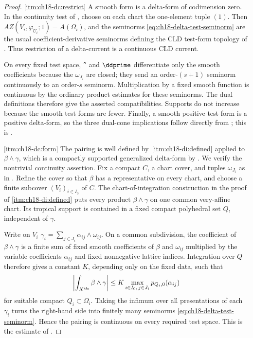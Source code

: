 \begin{proof}
\cref{itm:ch18-dc:restrict} A smooth form is a delta-form of codimension
zero.  In the continuity test of , choose on
each chart the one-element tuple $(1)$.  Then
$AZ(V_i,\varphi_{U_i};1)=A(\Omega_i)$, and the seminorms
\eqref{eq:ch18-delta-test-seminorm} are the usual coefficient-derivative
seminorms defining the CLD test-form topology of
.  Thus restriction of a delta-current is a
continuous CLD current.

On every fixed test space, $\dprime$ and $\ddprime$ differentiate only the
smooth coefficients because the $\omega_{J_i}$ are closed; they send an
order-$(s+1)$ seminorm continuously to an order-$s$ seminorm.
Multiplication by a fixed smooth function is continuous by the ordinary
product estimates for these seminorms.  The dual definitions therefore give
the asserted compatibilities.  Supports do not increase because the smooth
test forms are fewer.  Finally, a smooth positive test form is a positive
delta-form, so the three dual-cone implications follow directly from
; this is \cite[Remark~2.12]{GK19}.

\cref{itm:ch18-dc:form} The pairing is well defined by
\,\cref{itm:ch18-di:defined} applied to
$\beta\wedge\gamma$, which is a compactly supported generalized delta-form
by .  We verify the nontrivial
continuity assertion.  Fix a compact $C$, a chart cover, and tuples
$\omega_{J_i}$ as in .  Refine the cover so
that $\beta$ has a representative on every chart, and choose a finite
subcover $(V_i)_{i\in I_0}$ of $C$.  The chart-of-integration construction in
the proof of \cref{itm:ch18-di:defined} puts every product
$\beta\wedge\gamma$ on one common very-affine chart.  Its tropical support
is contained in a fixed compact polyhedral set $Q$, independent of
$\gamma$.

Write on $V_i$
$\gamma_i=\sum_{j\in J_i}\alpha_{ij}\wedge\omega_{ij}$.  On a common
subdivision, the coefficient of $\beta\wedge\gamma$ is a finite sum of
fixed smooth coefficients of $\beta$ and $\omega_{ij}$ multiplied by the
variable coefficients $\alpha_{ij}$ and fixed nonnegative lattice indices.
Integration over $Q$ therefore gives a constant $K$, depending only on the
fixed data, such that
\[
 \left|\int_{X^{\An}}\beta\wedge\gamma\right|
 \leq K\max_{i\in I_0,\,j\in J_i}p_{Q_i,0}(\alpha_{ij})
\]
for suitable compact $Q_i\subset\Omega_i$.  Taking the infimum over all
presentations of each $\gamma_i$ turns the right-hand side into finitely many
seminorms \eqref{eq:ch18-delta-test-seminorm}.  Hence the pairing is
continuous on every required test space.  This is the estimate of
\cite[Proposition~6.6]{GK17}.


\end{proof}
